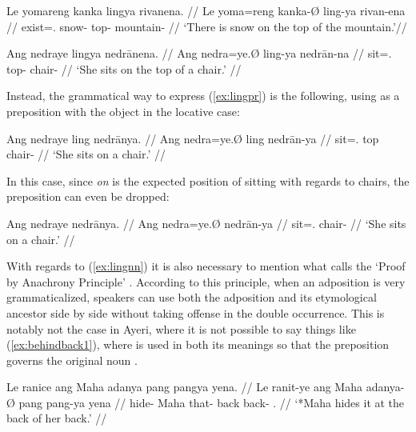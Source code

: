 \pex
\a\label{ex:lingnn}\begingl
	\gla Le yomareng kanka lingya rivanena. //
	\glb Le yoma=reng kanka-Ø ling-ya rivan-ena //
	\glc \PatTI{} exist=\TsgI{}.\Aarg{} snow-\Top{} top-\Loc{}
		mountain-\Gen{} //
	\glft `There is snow on the top of the mountain.'\footnotemark //
\endgl

\a\label{ex:lingpr}\begingl
	\gla *Ang nedraye lingya nedrānena. //
	\glb Ang nedra=ye.Ø ling-ya nedrān-na //
	\glc \AgtT{} sit=\TsgF{}.\Top{} top-\Loc{} chair-\Gen{} //
	\glft `\ques{}She sits on the top of a chair.' //
\endgl

\xe


\noindent Instead, the grammatical way to express (\ref{ex:lingpr}) is the 
following, using  as a preposition with the object in the 
locative case:

\ex\begingl
	\gla Ang nedraye ling nedrānya. //
	\glb Ang nedra=ye.Ø ling nedrān-ya //
	\glc \AgtT{} sit=\TsgF{}.\Top{} top chair-\Loc{} //
	\glft `She sits on a chair.' //
\endgl\xe

In this case, since \emph{on} is the expected position of sitting with regards 
to chairs, the preposition can even be dropped:

\ex\begingl
	\gla Ang nedraye nedrānya. //
	\glb Ang nedra=ye.Ø nedrān-ya //
	\glc \AgtT{} sit=\TsgF{}.\Top{} chair-\Loc{} //
	\glft `She sits on a chair.' //
\endgl\xe

With regards to (\ref{ex:lingnn}) it is also necessary to mention what 
\citeauthor{hagege2010} calls the `Proof by Anachrony Principle' 
\citep[158--159]{hagege2010}. According to this principle, when an adposition is 
very grammaticalized, speakers can use both the adposition and its etymological 
ancestor side by side without taking offense in the double occurrence. This is 
notably not the case in Ayeri, where it is not possible to say things like 
(\ref{ex:behindback1}), where  is used in both its meanings so 
that the preposition  governs the original noun 
.

\pex
\a\label{ex:behindback1}\begingl
	\gla *Le ranice ang Maha adanya pang pangya yena. //
	\glb Le ranit-ye ang Maha adanya-Ø pang pang-ya yena //
	\glc \PatTI{} hide-\TsgF{} \Aarg{} Maha that-\Top{} back back-\Loc{} 
		\TsgF{}.\Gen{} //
	\glft `*Maha hides it at the back of her back.' //
\endgl


